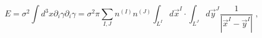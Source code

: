 \begin{equation}
E=\sigma ^{2}\int d^{3}x\partial _{i}\gamma \partial _{i}\gamma =\sigma
^{2}\pi \sum_{I,J}n^{(I)}n^{(J)}\int_{L^{I}}d\overrightarrow{x}^{I}\cdot
\int_{L^{J}}d\overrightarrow{y}^{J}\frac{1}{\left| \overrightarrow{x}^{I}-%
\overrightarrow{y}^{I}\right| }\;,  \label{efv}
\end{equation}

